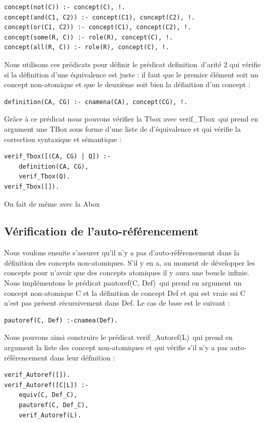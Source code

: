 \documentclass{article}
\begin{document}
\begin{verbatim}
concept(not(C)) :- concept(C), !.
concept(and(C1, C2)) :- concept(C1), concept(C2), !.
concept(or(C1, C2)) :- concept(C1), concept(C2), !.
concept(some(R, C)) :- role(R), concept(C), !.
concept(all(R, C)) :- role(R), concept(C), !.
\end{verbatim}

Nous utilisons ces prédicats pour définir le prédicat \color{blue}definition\color{black}\ d'arité 2 qui vérifie si la définition d'une équivalence est juste : il faut que le premier élément soit un concept non-atomique et que le deuxième soit bien la définition d'un concept :
\begin{verbatim}
definition(CA, CG) :- cnamena(CA), concept(CG), !.
\end{verbatim}

Grâce à ce prédicat nous pouvons vérifier la Tbox avec \color{blue}verif\_Tbox\color{black}\ qui prend en argument une TBox sous forme d'une liste de d'équivalence et qui vérifie la correction syntaxique et sémantique : 
\begin{verbatim}
verif_Tbox([(CA, CG) | Q]) :- 
    definition(CA, CG), 
    verif_Tbox(Q).
verif_Tbox([]).
\end{verbatim}
On fait de même avec la Abox
\subsection{Vérification de l'auto-référencement}
Nous voulons ensuite s'assurer qu'il n'y a pas d'auto-référencement dans la définition des concepts non-atomiques. S'il y en a, au moment de développer les concepts pour n'avoir que des concepts atomiques il y aura une boucle infinie. Nous implémentons le prédicat \color{blue}pautoref(C, Def)\color{black}\ qui prend en argument un concept non-atomique C et la définition de concept Def et qui est vraie ssi C n'est pas présent récursivement dans Def. Le cas de base est le suivant :
\begin{verbatim}
pautoref(C, Def) :-cnamea(Def).
\end{verbatim}

Nous pouvons ainsi construire le prédicat \color{blue}verif\_Autoref(L)\color{black}\ qui prend en argument la liste des concept non-atomiques et qui vérifie s'il n'y a pas auto-référencement dans leur définition : 
\begin{verbatim}
verif_Autoref([]).
verif_Autoref([C|L]) :-
	equiv(C, Def_C),
	pautoref(C, Def_C),
	verif_Autoref(L).
\end{verbatim}
\end{document}
